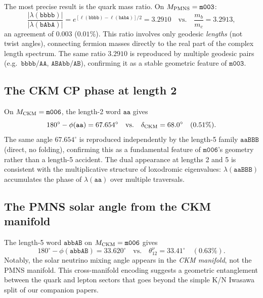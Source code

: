 \documentclass[11pt,a4paper]{article}
\newcommand{\mfld}[1]{\texttt{#1}}
\newcommand{\word}[1]{\texttt{#1}}
\newcommand{\degr}{^{\circ}}
\begin{document}
The most precise result is the quark mass ratio.
On $M_{\rm PMNS}=\mfld{m003}$:
\begin{equation}
  \frac{|\lambda(\word{bbbb})|}{|\lambda(\word{bAbA})|}
  = e^{[\ell(\word{bbbb})-\ell(\word{bAbA})]/2}
  = 3.2910 \quad\text{vs.}\quad \frac{m_b}{m_c}=3.2913,
  \label{eq:mbmc}
\end{equation}
an agreement of $0.003$ ($0.01\%$).
This ratio involves only geodesic \emph{lengths} (not twist angles),
connecting fermion masses directly to the real part of the complex length spectrum.
The same ratio $3.2910$ is reproduced by multiple geodesic pairs
(e.g.\ $\word{bbbb}/\word{AA}$, $\word{ABAbb}/\word{AB}$),
confirming it as a stable geometric feature of $\mfld{m003}$.

\subsection{The CKM CP phase at length 2}
\label{sec:delta_ckm}

On $M_{\rm CKM}=\mfld{m006}$, the length-2 word $\word{aa}$ gives
\begin{equation}
  180\degr - \phi(\word{aa}) = 67.654\degr
  \quad\text{vs.}\quad \delta_{\rm CKM}=68.0\degr \quad (0.51\%).
\end{equation}
The same angle $67.654\degr$ is reproduced independently by the length-5
family $\word{aaBBB}$ (direct, no folding), confirming this as a
fundamental feature of $\mfld{m006}$'s geometry rather than a length-5 accident.
The dual appearance at lengths 2 and 5 is consistent with the multiplicative
structure of loxodromic eigenvalues: $\lambda(\word{aaBBB})$ accumulates the
phase of $\lambda(\word{aa})$ over multiple traversals.

\subsection{The PMNS solar angle from the CKM manifold}
\label{sec:theta12nu}

The length-5 word $\word{abbAB}$ on $M_{\rm CKM}=\mfld{m006}$ gives
\begin{equation}
  180\degr - \phi(\word{abbAB}) = 33.620\degr
  \quad\text{vs.}\quad \theta_{12}^\nu=33.41\degr \quad (0.63\%).
\end{equation}
Notably, the solar neutrino mixing angle appears in the \emph{CKM manifold},
not the PMNS manifold.
This cross-manifold encoding suggests a geometric entanglement between the
quark and lepton sectors that goes beyond the simple K/N Iwasawa split
of our companion papers.
\end{document}
